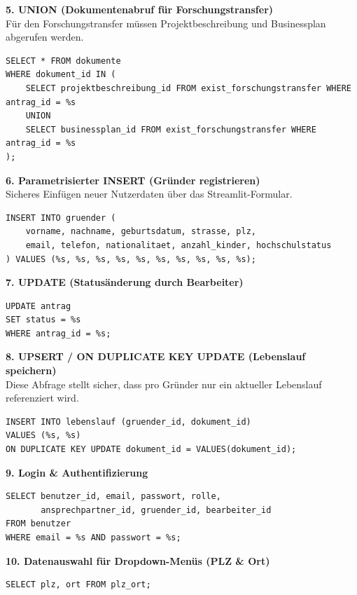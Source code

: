 \documentclass{article}
\begin{document}
\textbf{5. UNION (Dokumentenabruf für Forschungstransfer)}\\
Für den Forschungstransfer müssen Projektbeschreibung und Businessplan abgerufen werden.
\begin{verbatim}
SELECT * FROM dokumente 
WHERE dokument_id IN (
    SELECT projektbeschreibung_id FROM exist_forschungstransfer WHERE antrag_id = %s
    UNION
    SELECT businessplan_id FROM exist_forschungstransfer WHERE antrag_id = %s
);
\end{verbatim}

\textbf{6. Parametrisierter INSERT (Gründer registrieren)}\\
Sicheres Einfügen neuer Nutzerdaten über das Streamlit-Formular.
\begin{verbatim}
INSERT INTO gruender (
    vorname, nachname, geburtsdatum, strasse, plz, 
    email, telefon, nationalitaet, anzahl_kinder, hochschulstatus
) VALUES (%s, %s, %s, %s, %s, %s, %s, %s, %s, %s);
\end{verbatim}

\textbf{7. UPDATE (Statusänderung durch Bearbeiter)}\\
\begin{verbatim}
UPDATE antrag
SET status = %s
WHERE antrag_id = %s;
\end{verbatim}

\textbf{8. UPSERT / ON DUPLICATE KEY UPDATE (Lebenslauf speichern)}\\
Diese Abfrage stellt sicher, dass pro Gründer nur ein aktueller Lebenslauf referenziert wird.
\begin{verbatim}
INSERT INTO lebenslauf (gruender_id, dokument_id)
VALUES (%s, %s) 
ON DUPLICATE KEY UPDATE dokument_id = VALUES(dokument_id);
\end{verbatim}

\textbf{9. Login \& Authentifizierung}\\
\begin{verbatim}
SELECT benutzer_id, email, passwort, rolle, 
       ansprechpartner_id, gruender_id, bearbeiter_id
FROM benutzer
WHERE email = %s AND passwort = %s;
\end{verbatim}

\textbf{10. Datenauswahl für Dropdown-Menüs (PLZ \& Ort)}\\
\begin{verbatim}
SELECT plz, ort FROM plz_ort;
\end{verbatim}
\end{document}
